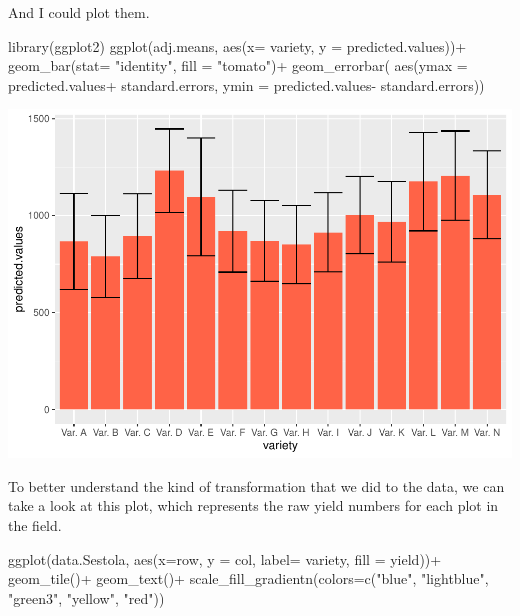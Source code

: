 \documentclass[
]{book}
\newenvironment{Shaded}{\begin{snugshade}}{\end{snugshade}}
\newcommand{\AttributeTok}[1]{\textcolor[rgb]{0.77,0.63,0.00}{#1}}
\newcommand{\FunctionTok}[1]{\textcolor[rgb]{0.00,0.00,0.00}{#1}}
\newcommand{\NormalTok}[1]{#1}
\newcommand{\SpecialCharTok}[1]{\textcolor[rgb]{0.00,0.00,0.00}{#1}}
\newcommand{\StringTok}[1]{\textcolor[rgb]{0.31,0.60,0.02}{#1}}
\begin{document}
And I could plot them.

\begin{Shaded}
\begin{Highlighting}[]
\FunctionTok{library}\NormalTok{(ggplot2)}
\FunctionTok{ggplot}\NormalTok{(adj.means, }\FunctionTok{aes}\NormalTok{(}\AttributeTok{x=}\NormalTok{ variety, }\AttributeTok{y =}\NormalTok{ predicted.values))}\SpecialCharTok{+}
  \FunctionTok{geom\_bar}\NormalTok{(}\AttributeTok{stat=} \StringTok{"identity"}\NormalTok{, }\AttributeTok{fill =} \StringTok{"tomato"}\NormalTok{)}\SpecialCharTok{+}
  \FunctionTok{geom\_errorbar}\NormalTok{( }\FunctionTok{aes}\NormalTok{(}\AttributeTok{ymax =}\NormalTok{ predicted.values}\SpecialCharTok{+}\NormalTok{ standard.errors,}
                     \AttributeTok{ymin =}\NormalTok{ predicted.values}\SpecialCharTok{{-}}\NormalTok{ standard.errors))}
\end{Highlighting}
\end{Shaded}

\includegraphics{PPB-Toolkit-for-R-and-R-Studio_files/figure-latex/unnamed-chunk-114-1.pdf}

To better understand the kind of transformation that we did to the data, we can take a look at this plot, which represents the raw yield numbers for each plot in the field.

\begin{Shaded}
\begin{Highlighting}[]
\FunctionTok{ggplot}\NormalTok{(data.Sestola, }\FunctionTok{aes}\NormalTok{(}\AttributeTok{x=}\NormalTok{row, }\AttributeTok{y =}\NormalTok{ col, }\AttributeTok{label=}\NormalTok{ variety, }\AttributeTok{fill =}\NormalTok{ yield))}\SpecialCharTok{+}
  \FunctionTok{geom\_tile}\NormalTok{()}\SpecialCharTok{+}
  \FunctionTok{geom\_text}\NormalTok{()}\SpecialCharTok{+}
  \FunctionTok{scale\_fill\_gradientn}\NormalTok{(}\AttributeTok{colors=}\FunctionTok{c}\NormalTok{(}\StringTok{"blue"}\NormalTok{, }\StringTok{"lightblue"}\NormalTok{, }\StringTok{"green3"}\NormalTok{, }\StringTok{"yellow"}\NormalTok{, }\StringTok{"red"}\NormalTok{))}
\end{Highlighting}
\end{Shaded}
\end{document}
